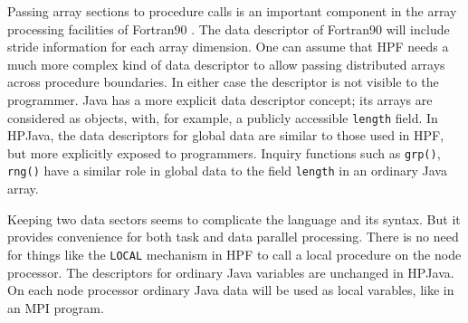 Passing array sections to procedure calls is an important component in
the array processing facilities of Fortran90 \cite{Fortran90}.  The data
descriptor of Fortran90 will include stride information for each array
dimension.  One can assume that HPF needs a much more complex kind of
data descriptor to allow passing distributed arrays across procedure
boundaries.  In either case the descriptor is not visible to the
programmer.  Java has a more explicit data descriptor concept; its
arrays are considered as objects, with, for example, a publicly
accessible \texttt{length} field.  In HPJava, the data descriptors for
global data are similar to those used in HPF, but more explicitly
exposed to programmers.  Inquiry functions such as \texttt{grp()},
\texttt{rng()} have a similar role in global data to the field
\texttt{length} in an ordinary Java array.


Keeping two data sectors seems to complicate the language and its
syntax.  But it provides convenience for both task and data parallel
processing.  There is no need for things like the \texttt{LOCAL}
mechanism in HPF to call a local procedure on the node processor.  The
descriptors for ordinary Java variables are unchanged in HPJava.  On
each node processor ordinary Java data will be used as local varables,
like in an MPI program.

%

